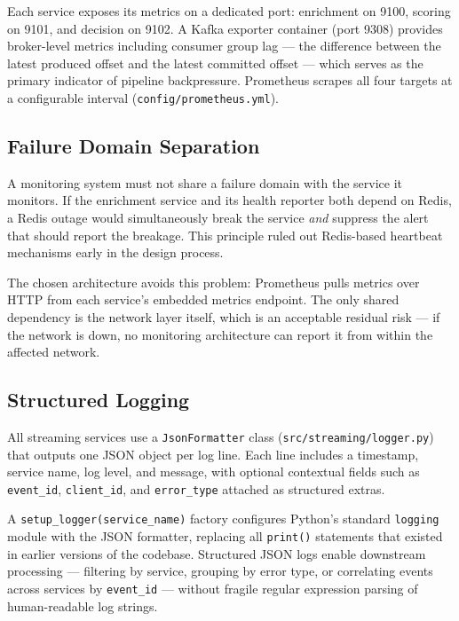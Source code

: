 Each service exposes its metrics on a dedicated port: enrichment on 9100,
scoring on 9101, and decision on 9102. A Kafka exporter container (port
9308) provides broker-level metrics including consumer group lag --- the
difference between the latest produced offset and the latest committed
offset --- which serves as the primary indicator of pipeline backpressure.
Prometheus scrapes all four targets at a configurable interval
(\texttt{config/prometheus.yml}).

\subsection{Failure Domain Separation}

A monitoring system must not share a failure domain with the service it
monitors. If the enrichment service and its health reporter both depend on
Redis, a Redis outage would simultaneously break the service \textit{and}
suppress the alert that should report the breakage. This principle ruled
out Redis-based heartbeat mechanisms early in the design process.

The chosen architecture avoids this problem: Prometheus pulls metrics over
HTTP from each service's embedded metrics endpoint. The only shared
dependency is the network layer itself, which is an acceptable residual
risk --- if the network is down, no monitoring architecture can report it
from within the affected network.

\subsection{Structured Logging}

All streaming services use a \texttt{JsonFormatter} class
(\texttt{src/streaming/logger.py}) that outputs one JSON object per log
line. Each line includes a timestamp, service name, log level, and message,
with optional contextual fields such as \texttt{event\_id},
\texttt{client\_id}, and \texttt{error\_type} attached as structured
extras.

A \texttt{setup\_logger(service\_name)} factory configures Python's
standard \texttt{logging} module with the JSON formatter, replacing all
\texttt{print()} statements that existed in earlier versions of the
codebase. Structured JSON logs enable downstream processing --- filtering
by service, grouping by error type, or correlating events across services
by \texttt{event\_id} --- without fragile regular expression parsing of
human-readable log strings.
